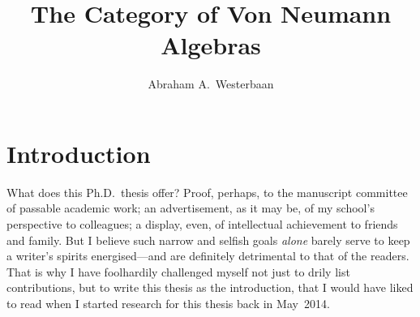 \documentclass[b5paper]{book}
\begin{document}
\title{%
\sffamily\color{darkblue}%
The Category of Von Neumann Algebras}
\author{Abraham A.~Westerbaan}
\maketitle

\makeatletter{}\makeatother

\chapter{Introduction}

\begin{parsec}
\begin{point}
What does this Ph.D.~thesis offer?
Proof, perhaps,
to the manuscript committee
of passable academic work;
an advertisement, as it may be,
of my school's perspective
to colleagues;
a display, even,
of intellectual achievement
to friends and family.
But I believe such narrow and selfish goals \emph{alone}
barely serve to keep a writer's spirits 
energised---and are definitely detrimental to that of the readers.
That is why I have foolhardily
challenged
myself
not just 
to drily list contributions,
but to write this thesis 
as the introduction,
that I would have liked to read
when I started
research for this thesis
back in May~2014.


\end{point}
\end{parsec}
\end{document}

